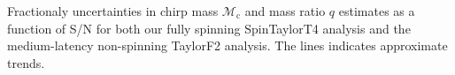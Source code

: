 \label{fig:Mc_q_std_snr} Fractionaly uncertainties in chirp mass $\mathcal{M}_\mathrm{c}$ and mass ratio $q$ estimates as a function of S/N for both our fully spinning SpinTaylorT4 analysis and the medium-latency non-spinning TaylorF2 analysis. The lines indicates approximate trends.
  